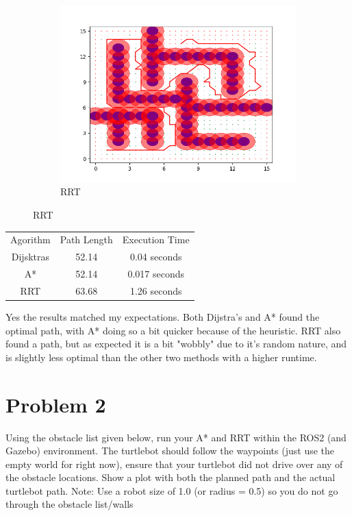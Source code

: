 \documentclass{article}
\begin{document}
\begin{figure}[H]
\begin {subfigure} [b] {0.5\textwidth}
        \includegraphics[width=\textwidth]{question1_rrt_path.png}
        \caption*{RRT}
    \end {subfigure}
\end{figure}

\bigskip
\begin{center}
    \begin{tabular}{ c c c }
        Agorithm & Path Length & Execution Time \\ 
        Dijsktras & 52.14 & 0.04 seconds \\
        A* & 52.14 & 0.017 seconds \\  
        RRT & 63.68 & 1.26 seconds \\

    \end{tabular}
\end{center}

Yes the results matched my expectations. Both Dijstra's and A* found the optimal path, with A* doing so a bit quicker because of the heuristic.
RRT also found a path, but as expected it is a bit "wobbly" due to it's random nature, and is slightly less optimal than the other two methods with a higher runtime.

\section*{Problem 2}
Using the obstacle list given below, run your A* and RRT within the ROS2 (and Gazebo)
environment. The turtlebot should follow the waypoints (just use the empty world for right now),
ensure that your turtlebot did not drive over any of the obstacle locations.
Show a plot with both the planned path and the actual turtlebot path.
Note: Use a robot size of 1.0 (or radius = 0.5) so you do not go through the obstacle list/walls
\end{document}
